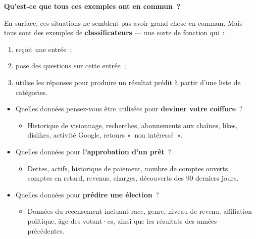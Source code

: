 \documentclass[12pt,a4paper]{article}
\begin{document}
\begin{thinkbox}
  \textbf{Qu'est-ce que tous ces exemples ont en commun~?}

  En surface, ces situations ne semblent pas avoir grand-chose en commun. Mais tous sont des exemples de \textbf{classificateurs} — une sorte de fonction qui~:
  \begin{enumerate}
    \item reçoit une entrée~;
    \item pose des questions sur cette entrée~;
    \item utilise les réponses pour produire un résultat prédit à partir d'une liste de catégories.
  \end{enumerate}
\end{thinkbox}

\begin{thinkbox}
  \begin{itemize}
    \item Quelles données pensez-vous être utilisées pour \textbf{deviner votre coiffure}~?
    \begin{itemize}
      \item Historique de visionnage, recherches, abonnements aux chaînes, likes, dislikes, activité Google, retours «~non intéressé~».
    \end{itemize}
    \item Quelles données pour \textbf{l'approbation d'un prêt}~?
    \begin{itemize}
      \item Dettes, actifs, historique de paiement, nombre de comptes ouverts, comptes en retard, revenus, charges, découverts des 90 derniers jours.
    \end{itemize}
    \item Quelles données pour \textbf{prédire une élection}~?
    \begin{itemize}
      \item Données du recensement incluant race, genre, niveau de revenu, affiliation politique, âge des votant·es, ainsi que les résultats des années précédentes.
    \end{itemize}
  \end{itemize}
\end{thinkbox}
\end{document}
